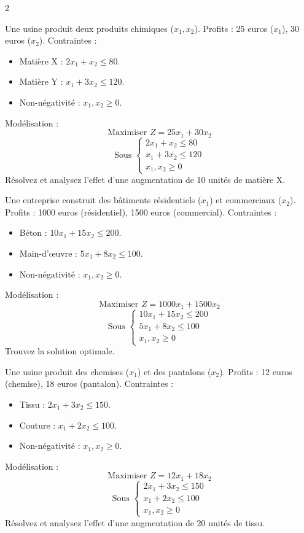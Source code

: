 \begin{multicols}{2}
\begin{exo}
	Une usine produit deux produits chimiques (\(x_1, x_2\)). Profits : 25 euros (\(x_1\)), 30 euros (\(x_2\)). Contraintes :
	\begin{itemize}
		\item Matière X : \(2x_1 + x_2 \leq 80\).
		\item Matière Y : \(x_1 + 3x_2 \leq 120\).
		\item Non-négativité : \(x_1, x_2 \geq 0\).
	\end{itemize}
	Modélisation :
	\[
	\text{Maximiser } Z = 25x_1 + 30x_2
	\]
	\[
	\text{Sous } \begin{cases}
	2x_1 + x_2 \leq 80 \\
	x_1 + 3x_2 \leq 120 \\
	x_1, x_2 \geq 0
	\end{cases}
	\]
	Résolvez et analysez l'effet d'une augmentation de 10 unités de matière X.
\end{exo}

\begin{exo}
	Une entreprise construit des bâtiments résidentiels (\(x_1\)) et commerciaux (\(x_2\)). Profits : 1000 euros (résidentiel), 1500 euros (commercial). Contraintes :
	\begin{itemize}
		\item Béton : \(10x_1 + 15x_2 \leq 200\).
		\item Main-d'œuvre : \(5x_1 + 8x_2 \leq 100\).
		\item Non-négativité : \(x_1, x_2 \geq 0\).
	\end{itemize}
	Modélisation :
	\[
	\text{Maximiser } Z = 1000x_1 + 1500x_2
	\]
	\[
	\text{Sous } \begin{cases}
	10x_1 + 15x_2 \leq 200 \\
	5x_1 + 8x_2 \leq 100 \\
	x_1, x_2 \geq 0
	\end{cases}
	\]
	Trouvez la solution optimale.
\end{exo}

\begin{exo}
	Une usine produit des chemises (\(x_1\)) et des pantalons (\(x_2\)). Profits : 12 euros (chemise), 18 euros (pantalon). Contraintes :
	\begin{itemize}
		\item Tissu : \(2x_1 + 3x_2 \leq 150\).
		\item Couture : \(x_1 + 2x_2 \leq 100\).
		\item Non-négativité : \(x_1, x_2 \geq 0\).
	\end{itemize}
	Modélisation :
	\[
	\text{Maximiser } Z = 12x_1 + 18x_2
	\]
	\[
	\text{Sous } \begin{cases}
	2x_1 + 3x_2 \leq 150 \\
	x_1 + 2x_2 \leq 100 \\
	x_1, x_2 \geq 0
	\end{cases}
	\]
	Résolvez et analysez l'effet d'une augmentation de 20 unités de tissu.
\end{exo}

\end{multicols}
